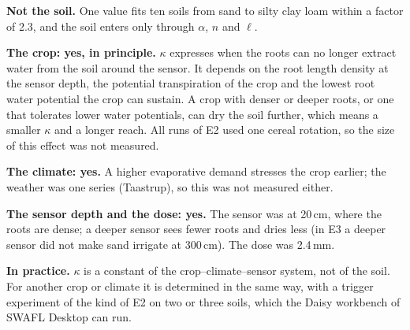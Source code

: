 \begin{keyresult}[title={What $\kappa$ depends on}]
\textbf{Not the soil.} One value fits ten soils from sand to silty clay loam within a factor of 2.3, and the soil enters only through $\alpha$, $n$ and $\ell$.

\textbf{The crop: yes, in principle.} $\kappa$ expresses when the roots can no longer extract water from the soil around the sensor. It depends on the root length density at the sensor depth, the potential transpiration of the crop and the lowest root water potential the crop can sustain. A crop with denser or deeper roots, or one that tolerates lower water potentials, can dry the soil further, which means a smaller $\kappa$ and a longer reach. All runs of E2 used one cereal rotation, so the size of this effect was not measured.

\textbf{The climate: yes.} A higher evaporative demand stresses the crop earlier; the weather was one series (Taastrup), so this was not measured either.

\textbf{The sensor depth and the dose: yes.} The sensor was at 20\,cm, where the roots are dense; a deeper sensor sees fewer roots and dries less (in E3 a deeper sensor did not make sand irrigate at 300\,cm). The dose was 2.4\,mm.

\textbf{In practice.} $\kappa$ is a constant of the crop--climate--sensor system, not of the soil. For another crop or climate it is determined in the same way, with a trigger experiment of the kind of E2 on two or three soils, which the Daisy workbench of SWAFL Desktop can run.
\end{keyresult}

